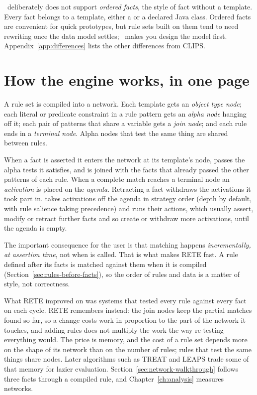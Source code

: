 \Morendo\ deliberately does not support \emph{ordered facts}, the
 style of fact without a template. Every fact belongs to a
template, either a  or a declared Java class. Ordered facts
are convenient for quick prototypes, but rule sets built on them tend to
need rewriting once the data model settles; \Morendo\ makes you design the
model first. Appendix~\ref{app:differences} lists the other differences
from CLIPS.

\section{How the engine works, in one page}

A rule set is compiled into a network. Each template gets an
\emph{object type node}; each literal or predicate constraint in a rule
pattern gets an \emph{alpha node} hanging off it; each pair of patterns that
share a variable gets a \emph{join node}; and each rule ends in a
\emph{terminal node}. Alpha nodes that test the same thing are shared
between rules.

When a fact is asserted it enters the network at its template's node,
passes the alpha tests it satisfies, and is joined with the facts that
already passed the other patterns of each rule. When a complete match
reaches a terminal node an \emph{activation} is placed on the
\emph{agenda}. Retracting a fact withdraws the activations it took part in.
 takes activations off the agenda in strategy order (depth by
default, with rule salience taking precedence) and runs their actions, which
usually assert, modify or retract further facts and so create or withdraw
more activations, until the agenda is empty.

The important consequence for the user is that matching happens
\emph{incrementally, at assertion time}, not when  is called.
That is what makes RETE fast. A rule defined after its facts is matched
against them when it is compiled (Section~\ref{sec:rules-before-facts}),
so the order of rules and data is a matter of style, not correctness.

What RETE improved on was systems that tested every rule against every
fact on each cycle. RETE remembers instead: the join nodes keep the
partial matches found so far, so a change costs work in proportion to the
part of the network it touches, and adding rules does not multiply the
work the way re-testing everything would. The price is memory, and the
cost of a rule set depends more on the shape of its network than on the
number of rules; rules that test the same things share nodes. Later
algorithms such as TREAT and LEAPS trade some of that memory for lazier
evaluation. Section~\ref{sec:network-walkthrough} follows three facts
through a compiled rule, and Chapter~\ref{ch:analysis} measures networks.
